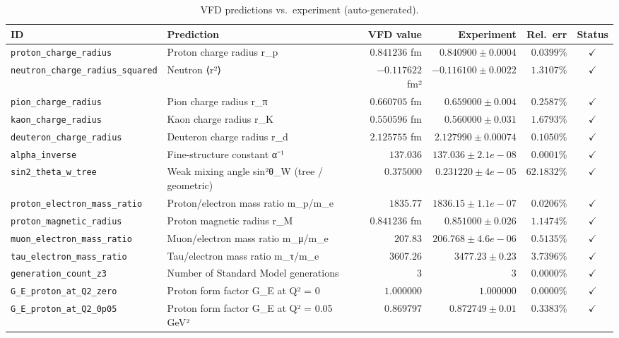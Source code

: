 \begin{table}[htbp]
\centering
\caption{VFD predictions vs.\ experiment (auto-generated).}
\label{tab:vfd-predictions}
\begin{tabular}{llrrrc}
\toprule
ID & Prediction & VFD value & Experiment & Rel.\ err & Status \\
\midrule
\texttt{proton\_charge\_radius} & Proton charge radius r\_p & $0.841236$ fm & $0.840900 \pm 0.0004$ & $0.0399\%$ & $\checkmark$ \\
\texttt{neutron\_charge\_radius\_squared} & Neutron ⟨r²⟩ & $-0.117622$ fm² & $-0.116100 \pm 0.0022$ & $1.3107\%$ & $\checkmark$ \\
\texttt{pion\_charge\_radius} & Pion charge radius r\_π & $0.660705$ fm & $0.659000 \pm 0.004$ & $0.2587\%$ & $\checkmark$ \\
\texttt{kaon\_charge\_radius} & Kaon charge radius r\_K & $0.550596$ fm & $0.560000 \pm 0.031$ & $1.6793\%$ & $\checkmark$ \\
\texttt{deuteron\_charge\_radius} & Deuteron charge radius r\_d & $2.125755$ fm & $2.127990 \pm 0.00074$ & $0.1050\%$ & $\checkmark$ \\
\texttt{alpha\_inverse} & Fine-structure constant α⁻¹ & $137.036$ & $137.036 \pm 2.1e-08$ & $0.0001\%$ & $\checkmark$ \\
\texttt{sin2\_theta\_w\_tree} & Weak mixing angle sin²θ\_W (tree / geometric) & $0.375000$ & $0.231220 \pm 4e-05$ & $62.1832\%$ & $\checkmark$ \\
\texttt{proton\_electron\_mass\_ratio} & Proton/electron mass ratio m\_p/m\_e & $1835.77$ & $1836.15 \pm 1.1e-07$ & $0.0206\%$ & $\checkmark$ \\
\texttt{proton\_magnetic\_radius} & Proton magnetic radius r\_M & $0.841236$ fm & $0.851000 \pm 0.026$ & $1.1474\%$ & $\checkmark$ \\
\texttt{muon\_electron\_mass\_ratio} & Muon/electron mass ratio m\_μ/m\_e & $207.83$ & $206.768 \pm 4.6e-06$ & $0.5135\%$ & $\checkmark$ \\
\texttt{tau\_electron\_mass\_ratio} & Tau/electron mass ratio m\_τ/m\_e & $3607.26$ & $3477.23 \pm 0.23$ & $3.7396\%$ & $\checkmark$ \\
\texttt{generation\_count\_z3} & Number of Standard Model generations & $3$ & $3$ & $0.0000\%$ & $\checkmark$ \\
\texttt{G\_E\_proton\_at\_Q2\_zero} & Proton form factor G\_E at Q² = 0 & $1.000000$ & $1.000000$ & $0.0000\%$ & $\checkmark$ \\
\texttt{G\_E\_proton\_at\_Q2\_0p05} & Proton form factor G\_E at Q² = 0.05 GeV² & $0.869797$ & $0.872749 \pm 0.01$ & $0.3383\%$ & $\checkmark$ \\

\end{tabular}
\end{table}
